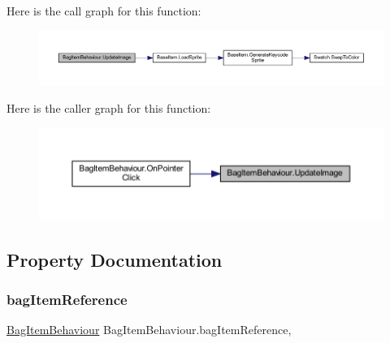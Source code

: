 Here is the call graph for this function\+:
\nopagebreak
\begin{figure}[H]
\begin{center}
\leavevmode
\includegraphics[width=350pt]{class_bag_item_behaviour_aaedcc49f5d2def63dcde17d72fdb3b9d_cgraph}
\end{center}
\end{figure}
Here is the caller graph for this function\+:
\nopagebreak
\begin{figure}[H]
\begin{center}
\leavevmode
\includegraphics[width=350pt]{class_bag_item_behaviour_aaedcc49f5d2def63dcde17d72fdb3b9d_icgraph}
\end{center}
\end{figure}


\subsection{Property Documentation}
\mbox{\label{class_bag_item_behaviour_a804cf27502bc5bb77a2fa80e178903db}} 
\subsubsection{\texorpdfstring{bagItemReference}{bagItemReference}}
{\footnotesize\ttfamily \mbox{\hyperlink{class_bag_item_behaviour}{Bag\+Item\+Behaviour}} Bag\+Item\+Behaviour.\+bag\+Item\+Reference\hspace{0.3cm}{\ttfamily [get]}, {\ttfamily [set]}}

\mbox{\label{class_bag_item_behaviour_a7772dc51a9cde63e29f6a683f8fbb451}} 
